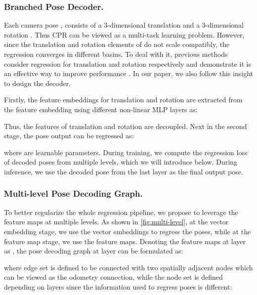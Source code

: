 \documentclass[letterpaper]{article} \usepackage{aaai23}  \usepackage{times}  \usepackage{helvet}  \usepackage{courier}  \usepackage[hyphens]{url}  \usepackage{graphicx} \urlstyle{rm} \def\UrlFont{\rm}  \usepackage{natbib}  \usepackage{caption} \frenchspacing  \setlength{\pdfpagewidth}{8.5in} \setlength{\pdfpageheight}{11in} \usepackage{booktabs}
\theoremstyle{remark}
\theoremstyle{plain}
\begin{document}
\subsubsection{Branched Pose Decoder.}\label{decoder}


Each camera pose , consists of a 3-dimensional translation  and a 3-dimensional rotation . Thus CPR can be viewed as a multi-task learning problem. However, since the translation and rotation elements of  do not scale compatibly, the regression converges in different basins. To deal with it, previous methods consider regression for translation and rotation respectively and demonstrate it is an effective way to improve performance \cite{irpnet}. In our paper, we also follow this insight to design the decoder.

Firstly, the feature embeddings  for translation and rotation are extracted from the feature embedding  using different non-linear MLP layers as:



Thus, the features of translation and rotation are decoupled. Next in the second stage, the pose output can be regressed as:


where  are learnable parameters. During training, we compute the regression loss of decoded poses from multiple levels, which we will introduce below. During inference, we use the decoded pose from the last layer as the final output pose.














\subsubsection{Multi-level Pose Decoding Graph.}  
To better regularize the whole regression pipeline, we propose to leverage the feature maps at multiple levels. As shown in \cref{fig:multi-level}, at the vector embedding stage, we use the vector embeddings to regress the poses, while at the feature map stage, we use the feature maps. Denoting the feature maps at layer  as , the pose decoding graph at layer  can be formulated as: 

where edge set  is defined to be connected with two spatially adjacent nodes which can be viewed as the odometry connection, while the node set  is defined depending on layers since the information used to regress poses is different:
\end{document}
